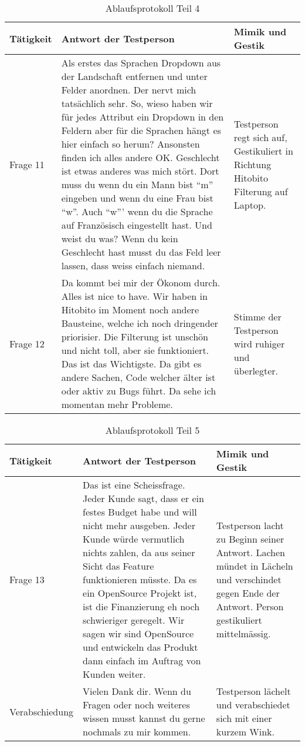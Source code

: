 \begin{table}[h!]
   \begin{tabular}{|L{0.3\textwidth}|L{0.4\textwidth}|L{0.2\textwidth}|}
       \hline
       \color{white}Tätigkeit & \color{white} Antwort der Testperson & \color{white} Mimik und Gestik \\
       \hline
       Frage 11 & Als erstes das Sprachen Dropdown aus der Landschaft entfernen und unter Felder anordnen. Der nervt mich tatsächlich sehr. So, wieso haben wir für jedes
       Attribut ein Dropdown in den Feldern aber für die Sprachen hängt es hier einfach so herum? Ansonsten finden
       ich alles andere OK. Geschlecht ist etwas anderes was mich stört. Dort muss du wenn du ein Mann bist ``m'' eingeben und wenn du eine Frau bist ``w''. 
       Auch ``w''' wenn du die Sprache auf Französisch eingestellt hast. Und weist du was? Wenn du kein Geschlecht hast musst du das Feld leer lassen, dass weiss einfach
       niemand. & Testperson regt sich auf, Gestikuliert in Richtung Hitobito Filterung auf Laptop. \\
       \hline
       Frage 12 & Da kommt bei mir der Ökonom durch. Alles ist nice to have. Wir haben in Hitobito im Moment noch andere Bausteine, welche ich noch dringender priorisier. Die Filterung
       ist unschön und nicht toll, aber sie funktioniert. Das ist das Wichtigste. Da gibt es andere Sachen, Code welcher älter ist oder aktiv zu Bugs führt. Da sehe ich momentan mehr Probleme. 
       & Stimme der Testperson wird ruhiger und überlegter. \\
     \hline
     \end{tabular}
     \caption{Ablaufsprotokoll Teil 4}
\end{table}

\newpage

\begin{table}[h!]
   \begin{tabular}{|L{0.3\textwidth}|L{0.4\textwidth}|L{0.2\textwidth}|}
       \hline
       \color{white}Tätigkeit & \color{white} Antwort der Testperson & \color{white} Mimik und Gestik \\
       \hline
       Frage 13 & Das ist eine Scheissfrage. Jeder Kunde sagt, dass er ein festes Budget habe und will nicht mehr ausgeben. Jeder Kunde würde vermutlich nichts zahlen, da
       aus seiner Sicht das Feature funktionieren müsste. Da es ein OpenSource Projekt ist, ist die Finanzierung eh noch schwieriger geregelt. Wir sagen wir sind OpenSource und
       entwickeln das Produkt dann einfach im Auftrag von Kunden weiter.
         & Testperson lacht zu Beginn seiner Antwort. Lachen mündet in Lächeln und verschindet gegen Ende der Antwort. Person gestikuliert mittelmässig. \\
       \hline
       Verabschiedung & Vielen Dank dir. Wenn du Fragen oder noch weiteres wissen musst kannst du gerne nochmals zu mir kommen. & Testperson lächelt und verabschiedet sich mit einer kurzem Wink. \\
     \hline
     \end{tabular}
     \caption{Ablaufsprotokoll Teil 5}
\end{table}

